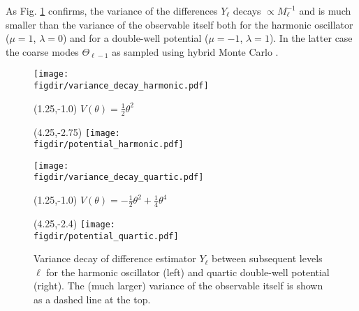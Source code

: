 \documentclass[11pt]{article}
\newcommand{\figdir}{./figures/}
\begin{document}
As Fig. \ref{fig:quantum_results} confirms, the variance of the differences $Y_\ell$ decays $\propto M_\ell^{-1}$ and is much smaller than the variance of the observable itself both for the harmonic oscillator ($\mu=1$, $\lambda=0$) and for a double-well potential ($\mu=-1$, $\lambda=1$). In the latter case the coarse modes $\Theta_{\ell-1}$ as sampled using hybrid Monte Carlo \cite{Duane1987}.
\begin{figure}
  \begin{center}
  \begin{minipage}{0.45\linewidth}
    \texttt{[image: \\figdir/variance\_decay\_harmonic.pdf]}
    \begin{textblock}{4.0}(1.25,-1.0)
      $V(\theta)=\frac{1}{2}\theta^2$
    \end{textblock}
    \begin{textblock}{4.0}(4.25,-2.75)
      \texttt{[image: \\figdir/potential\_harmonic.pdf]}
    \end{textblock}
  \end{minipage}
  \hfill
  \begin{minipage}{0.45\linewidth}
    \texttt{[image: \\figdir/variance\_decay\_quartic.pdf]}
    \begin{textblock}{4.0}(1.25,-1.0)
      $V(\theta)=-\frac{1}{2}\theta^2+\frac{1}{4}\theta^4$
    \end{textblock}
    \begin{textblock}{4.0}(4.25,-2.4)
      \texttt{[image: \\figdir/potential\_quartic.pdf]}
    \end{textblock}
  \end{minipage}
  \caption{Variance decay of difference estimator $Y_\ell$ between subsequent levels $\ell$ for the harmonic oscillator (left) and quartic double-well potential (right). The (much larger) variance of the observable itself is shown as a dashed line at the top.}
  \label{fig:quantum_results}
  \end{center}
\end{figure}
\end{document}
